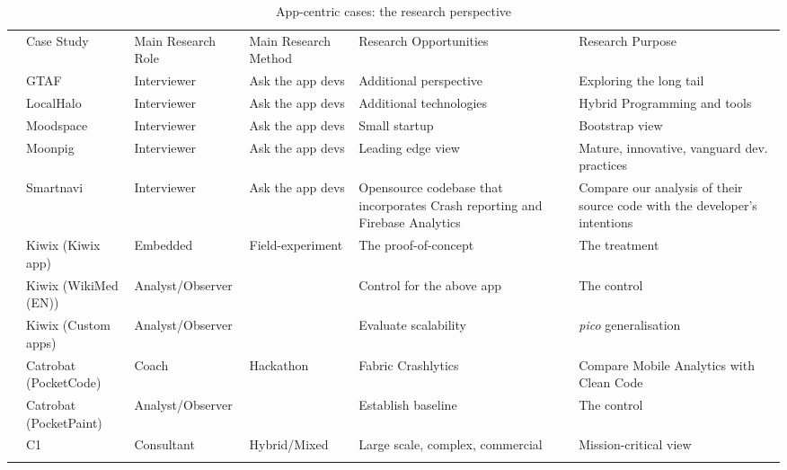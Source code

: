 \begin{table}
    \centering
    \tabcolsep=0.1cm
    \tiny
    \begin{tabular}{clllp{3.3cm}p{3.3cm}}\toprule
    & Case Study                 & Main Research Role &  Main Research Method   & Research Opportunities             & Research Purpose \\
    \arrayrulecolor{blue!70}\midrule
    \multirow{4}{*}{\large {\rotatebox[origin=c]{90}{Interviews}}} & GTAF                       & Interviewer        & Ask the app devs & Additional perspective & Exploring the long tail \\
    & LocalHalo                  & Interviewer        & Ask the app devs & Additional technologies & Hybrid Programming and tools \\
    & Moodspace                  & Interviewer        & Ask the app devs & Small startup &Bootstrap view \\
    & Moonpig                    & Interviewer        & Ask the app devs & Leading edge view & Mature, innovative, vanguard dev. practices \\
    & Smartnavi                  & Interviewer        & Ask the app devs & Opensource codebase that incorporates Crash reporting and Firebase Analytics & Compare our analysis of their source code with the developer's intentions \\
    \arrayrulecolor{blue!70}\midrule
    \multirow{6}{*}{\large \rotatebox[origin=c]{90}{\parbox[c]{4cm}{\centering Interventions}}} & Kiwix (Kiwix app)          & Embedded           & Field-experiment   & The proof-of-concept      & The treatment \\ 
    & Kiwix (WikiMed (EN))       & Analyst/Observer   &                    & Control for the above app & The control  \\
    & Kiwix (Custom apps)        & Analyst/Observer   &                    & Evaluate scalability      & \textit{pico} generalisation \\
    \arrayrulecolor{blue!20}\midrule
    & Catrobat (PocketCode)      & Coach              & Hackathon   & Fabric Crashlytics        & Compare Mobile Analytics with Clean Code \\
    & Catrobat (PocketPaint)     & Analyst/Observer   &                    & Establish baseline        & The control  \\
     \midrule
    & C1                         & Consultant         & Hybrid/Mixed & Large scale, complex, commercial & Mission-critical view \\
    \arrayrulecolor{black}\bottomrule
    \end{tabular}
    \caption{App-centric cases: the research perspective}
    \label{tab:app-centric-studies-research-perspective}
\end{table}

